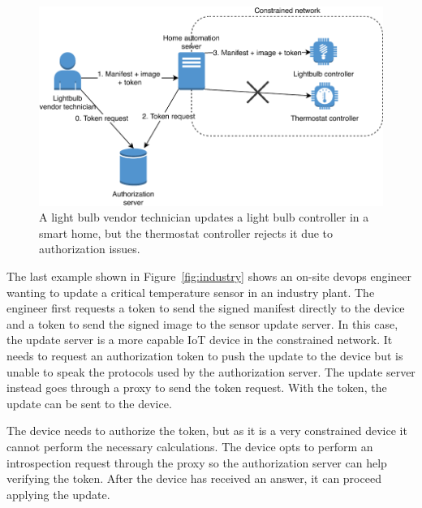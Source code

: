 \documentclass[0-thesis.tex]{subfiles}
\begin{document}
\begin{figure}[t]
    \caption{A light bulb vendor technician updates a light bulb controller in a smart
                home, but the thermostat controller rejects it due to authorization
                issues.}
    \label{fig:smart-home}
    \includegraphics{images/use-case-smart-home.pdf}
\end{figure}

The last example shown in Figure~\ref{fig:industry} shows an on-site devops engineer
wanting to update a critical temperature sensor in an industry plant. The engineer first
requests a token to send the signed manifest directly to the device and a token to send
the signed image to the sensor update server. In this case, the update server is a more
capable IoT device in the constrained network. It needs to request an authorization token
to push the update to the device but is unable to speak the protocols used by the
authorization server. The update server instead goes through a proxy to send the token
request. With the token, the update can be sent to the device.

The device needs to authorize the token, but as it is a very constrained device it cannot
perform the necessary calculations. The device opts to perform an introspection request
through the proxy so the authorization server can help verifying the token. After the
device has received an answer, it can proceed applying the update.
\end{document}
